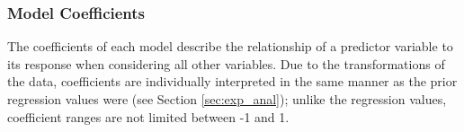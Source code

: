 \documentclass[review,12pt,authoryear]{elsarticle}
\begin{document}
\begin{linenumbers}
\subsubsection{Model Coefficients}
%
The coefficients of each model describe the relationship of a predictor variable to its response when considering all other variables. Due to the transformations of the data, coefficients are individually interpreted in the same manner as the prior regression values were (see Section \ref{sec:exp_anal}); unlike the regression values,  coefficient ranges are not limited between -1 and 1.
\newline
\begin{table}[]
  \caption{Summary of each Models coefficients for continuous variables}\label{tab:contvar}
\end{table}
\end{linenumbers}
\end{document}
